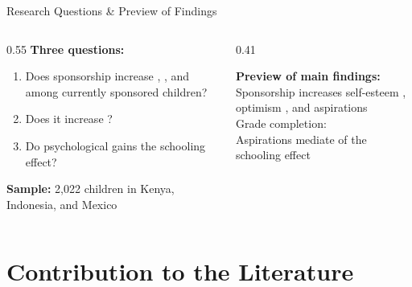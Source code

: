 \documentclass[aspectratio=169, 10pt]{beamer}
\begin{document}
\begin{frame}{Research Questions \& Preview of Findings}
  \begin{columns}
    \begin{column}{0.55\textwidth}
      \textbf{Three questions:}
      \begin{enumerate}
        \item Does sponsorship increase , , and  among currently sponsored children?
        \item Does it increase ?
        \item Do psychological gains  the schooling effect?
      \end{enumerate}
      \vspace{0.7em}
      \textbf{Sample:} 2,022 children in Kenya, Indonesia, and Mexico
    \end{column}
    \begin{column}{0.41\textwidth}
      \begin{resultbox}
        \textbf{Preview of main findings:}\\[0.4em]
        Sponsorship increases self-esteem , optimism , and aspirations \\[0.3em]
        Grade completion: \\[0.3em]
        Aspirations mediate  of the schooling effect
      \end{resultbox}
    \end{column}
  \end{columns}
\end{frame}

\section{Contribution to the Literature}
\end{document}
